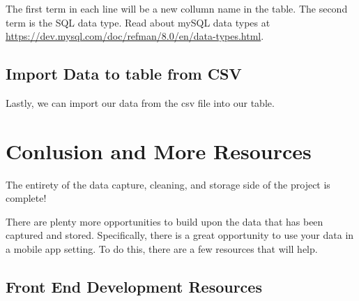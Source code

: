 \documentclass[]{book}
\newenvironment{Shaded}{\begin{snugshade}}{\end{snugshade}}
\newcommand{\KeywordTok}[1]{\textcolor[rgb]{0.13,0.29,0.53}{\textbf{#1}}}
\newcommand{\DecValTok}[1]{\textcolor[rgb]{0.00,0.00,0.81}{#1}}
\newcommand{\CharTok}[1]{\textcolor[rgb]{0.31,0.60,0.02}{#1}}
\newcommand{\StringTok}[1]{\textcolor[rgb]{0.31,0.60,0.02}{#1}}
\newcommand{\OtherTok}[1]{\textcolor[rgb]{0.56,0.35,0.01}{#1}}
\newcommand{\NormalTok}[1]{#1}
\begin{document}
The first term in each line will be a new collumn name in the table. The
second term is the SQL data type. Read about mySQL data types at
\url{https://dev.mysql.com/doc/refman/8.0/en/data-types.html}.

\section{Import Data to table from
CSV}\label{import-data-to-table-from-csv}

Lastly, we can import our data from the csv file into our table.

\begin{Shaded}
\end{Shaded}

\chapter{Conlusion and More
Resources}\label{conlusion-and-more-resources}

The entirety of the data capture, cleaning, and storage side of the
project is complete!

There are plenty more opportunities to build upon the data that has been
captured and stored. Specifically, there is a great opportunity to use
your data in a mobile app setting. To do this, there are a few resources
that will help.

\section{Front End Development
Resources}\label{front-end-development-resources}
\end{document}
